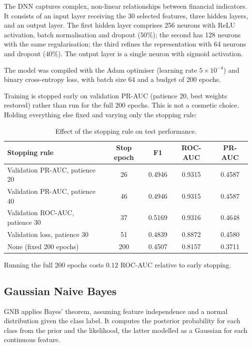 \documentclass[11pt]{article}
\begin{document}
The DNN captures complex, non-linear relationships between financial
indicators. It consists of an input layer receiving the 30 selected features,
three hidden layers, and an output layer. The first hidden layer comprises 256
neurons with ReLU activation, batch normalisation and dropout ($50\%$); the
second has 128 neurons with the same regularisation; the third refines the
representation with 64 neurons and dropout ($40\%$). The output layer is a
single neuron with sigmoid activation.

The model was compiled with the Adam optimiser (learning rate $5\times10^{-4}$)
and binary cross-entropy loss, with batch size 64 and a budget of 200 epochs.

Training is stopped early on validation PR-AUC (patience 20, best weights
restored) rather than run for the full 200 epochs. This is not a cosmetic
choice. Holding everything else fixed and varying only the stopping rule:

\begin{table}[H]
    \centering
    \small
    \caption{Effect of the stopping rule on test performance.}
    \label{tab:earlystop}
    \begin{tabular}{lcccc}
        \toprule
        \textbf{Stopping rule} & \textbf{Stop epoch} & \textbf{F1} & \textbf{ROC-AUC} & \textbf{PR-AUC} \\
        \midrule
        Validation PR-AUC, patience 20  & 26  & 0.4946 & 0.9315 & 0.4587 \\
        Validation PR-AUC, patience 40  & 46  & 0.4946 & 0.9315 & 0.4587 \\
        Validation ROC-AUC, patience 30 & 37  & 0.5169 & 0.9316 & 0.4648 \\
        Validation loss, patience 30    & 51  & 0.4839 & 0.8872 & 0.4580 \\
        None (fixed 200 epochs)         & 200 & 0.4507 & 0.8157 & 0.3711 \\
        \bottomrule
    \end{tabular}
\end{table}

Running the full 200 epochs costs $0.12$ ROC-AUC relative to early stopping.

\subsection{Gaussian Naive Bayes}

GNB applies Bayes' theorem, assuming feature independence and a normal
distribution given the class label. It computes the posterior probability for
each class from the prior and the likelihood, the latter modelled as a Gaussian
for each continuous feature.
\end{document}
